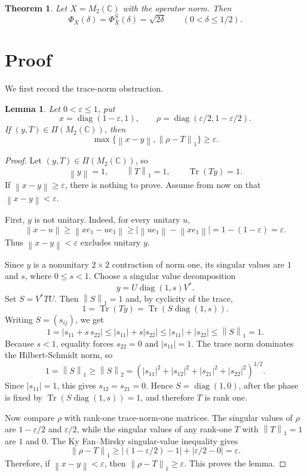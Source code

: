 \documentclass[11pt]{article}
\newtheorem{theorem}{Theorem}
\newtheorem{lemma}{Lemma}
\newcommand{\Tr}{\operatorname{Tr}}
\newcommand{\diag}{\operatorname{diag}}
\newcommand{\norm}[1]{\left\lVert #1 \right\rVert}
\newcommand{\eps}{\varepsilon}
\begin{document}
\begin{theorem}
Let \(X=M_2(\mathbb C)\) with the operator norm. Then
\[
  \Phi_X(\delta)=\Phi_X^S(\delta)=\sqrt{2\delta}
  \qquad (0<\delta\leq 1/2).
\]
\end{theorem}

\section*{Proof}

We first record the trace-norm obstruction.

\begin{lemma}\label{lem:rank-one-distance}
Let \(0<\eps\leq1\), put
\[
  x=\diag(1-\eps,1),\qquad
  \rho=\diag(\eps/2,1-\eps/2).
\]
If \((y,T)\in \Pi(M_2(\mathbb C))\), then
\[
  \max\{\norm{x-y},\norm{\rho-T}_1\}\geq \eps .
\]
\end{lemma}

\begin{proof}
Let \((y,T)\in\Pi(M_2(\mathbb C))\), so
\[
  \norm{y}=1,\qquad \norm{T}_1=1,\qquad \Tr(Ty)=1.
\]
If \(\norm{x-y}\geq\eps\), there is nothing to prove. Assume from now on
that \(\norm{x-y}<\eps\).

First, \(y\) is not unitary. Indeed, for every unitary \(u\),
\[
  \norm{x-u}\geq \norm{xe_1-ue_1}
  \geq \bigl|\norm{ue_1}-\norm{xe_1}\bigr|
  =1-(1-\eps)=\eps .
\]
Thus \(\norm{x-y}<\eps\) excludes unitary \(y\).

Since \(y\) is a nonunitary \(2\times2\) contraction of norm one, its
singular values are \(1\) and \(s\), where \(0\leq s<1\). Choose a singular
value decomposition
\[
  y=U\diag(1,s)V^* .
\]
Set \(S=V^*TU\). Then \(\norm{S}_1=1\) and, by cyclicity of the trace,
\[
  1=\Tr(Ty)=\Tr(S\diag(1,s)).
\]
Writing \(S=(s_{ij})\), we get
\[
  1=\left|s_{11}+s\,s_{22}\right|
  \leq |s_{11}|+s|s_{22}|
  \leq |s_{11}|+|s_{22}|
  \leq \norm{S}_1=1.
\]
Because \(s<1\), equality forces \(s_{22}=0\) and \(|s_{11}|=1\). The
trace norm dominates the Hilbert-Schmidt norm, so
\[
  1=\norm{S}_1\geq \norm{S}_2
  =\left(|s_{11}|^2+|s_{12}|^2+|s_{21}|^2+|s_{22}|^2\right)^{1/2}.
\]
Since \(|s_{11}|=1\), this gives \(s_{12}=s_{21}=0\). Hence
\(S=\diag(1,0)\), after the phase is fixed by
\(\Tr(S\diag(1,s))=1\), and therefore \(T\) is rank one.

Now compare \(\rho\) with rank-one trace-norm-one matrices. The singular
values of \(\rho\) are \(1-\eps/2\) and \(\eps/2\), while the singular
values of any rank-one \(T\) with \(\norm{T}_1=1\) are \(1\) and \(0\).
The Ky Fan--Mirsky singular-value inequality gives
\[
  \norm{\rho-T}_1
  \geq \left|(1-\eps/2)-1\right|+\left|\eps/2-0\right|
  =\eps .
\]
Therefore, if \(\norm{x-y}<\eps\), then \(\norm{\rho-T}_1\geq\eps\). This
proves the lemma.
\end{proof}
\end{document}
